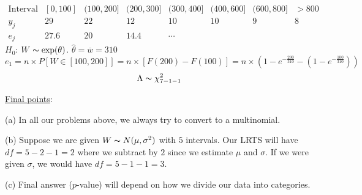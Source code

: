 \begin{exbox}
    \begin{example}[Exponential]
        \[
            \begin{array}{cccccccc}
                \text{Interval} & [0,100] & (100,200] & (200,300] & (300,400] & (400,600] & (600,800] & >800 \\
                y_j             & 29      & 22        & 12        & 10        & 10        & 9         & 8    \\
                e_j             & 27.6    & 20        & 14.4      & \cdots
            \end{array}
        \]
        $ H_0 $: $ W \thicksim \exp(\theta) $. $ \hat{\theta}=\overline{w}=310 $
        \[ e_1=n\times P\left[ W\in[100,200] \right]=n\times \left[ F(200)-F(100) \right]=
            n\times\left( 1-e^{-\frac{200}{310}}-\left( 1-e^{-\frac{100}{310}} \right) \right) \]
        \[ \Lambda \thicksim \chi^2_{7-1-1} \]
    \end{example}
\end{exbox}
\underline{Final points}:

(a) In all our problems above, we always try to convert to a multinomial.

(b) Suppose we are given $ W \thicksim N(\mu,\sigma^2) $ with $ 5 $ intervals.
Our LRTS will have $ df=5-2-1=2 $ where we subtract by $ 2 $ since we estimate $ \mu $ and $ \sigma $.
If we were given $ \sigma $, we would have $ df=5-1-1=3 $.

(c) Final answer ($ p $-value) will depend on how we divide our data into categories.
